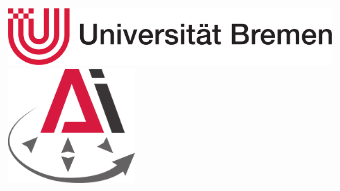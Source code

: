 \begin{titlepage}
	\vspace*{-2.2cm}
	\begin{adjustwidth}{-0cm}{-2.3cm}
	\thispagestyle{empty}
        \begin{figure}
            \begin{minipage}{.4\linewidth}
	\begin{flushleft}
		\includegraphics[height=1.5cm]{unihb/unilogo-transp.pdf}
	
	\end{flushleft}
    \end{minipage}
    \hspace{.2\linewidth}
            \begin{minipage}{.4\linewidth}
	\begin{flushright}
		\includegraphics[height=3.0cm]{unihb/logo-ai-small.pdf}
	
	\end{flushright}
    \end{minipage}
\end{figure}
	
	  \vfill
	  
	  \vfill
	  
	  {\Large \thesistype}\\[2.5ex]
	  {\Large\em \myauthor}
	  

\end{adjustwidth}
\end{titlepage}
